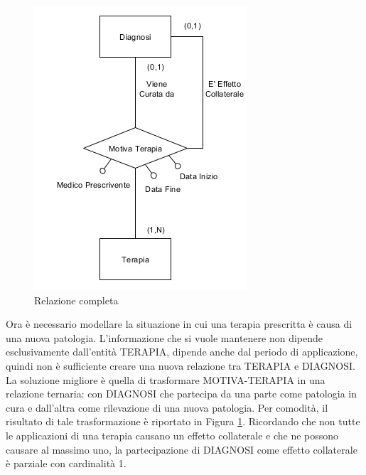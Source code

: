 \documentclass{article}
\begin{document}
\begin{figure}[!ht]
\begin{minipage}{.5\textwidth}
\includegraphics[width=\linewidth]{piccolo2} \caption{Relazione completa}
\label{schema_piccolo2} \end{minipage} \end{figure}

Ora è necessario modellare la situazione in cui una terapia prescritta è causa
di una nuova patologia.  L'informazione che si vuole mantenere non dipende
esclusivamente dall'entità TERAPIA, dipende anche dal periodo di applicazione,
quindi non è sufficiente creare una nuova relazione tra TERAPIA e DIAGNOSI.  La
soluzione migliore è quella di trasformare MOTIVA-TERAPIA in una relazione
ternaria: con DIAGNOSI che partecipa da una parte come patologia in cura e
dall'altra come rilevazione di una nuova patologia.  Per comodità, il risultato
di tale trasformazione è riportato in Figura \ref{schema_piccolo2}.  Ricordando
che non tutte le applicazioni di una terapia causano un effetto collaterale e
che ne possono causare al massimo uno, la partecipazione di DIAGNOSI come
effetto collaterale è parziale con cardinalità 1.
\end{document}
